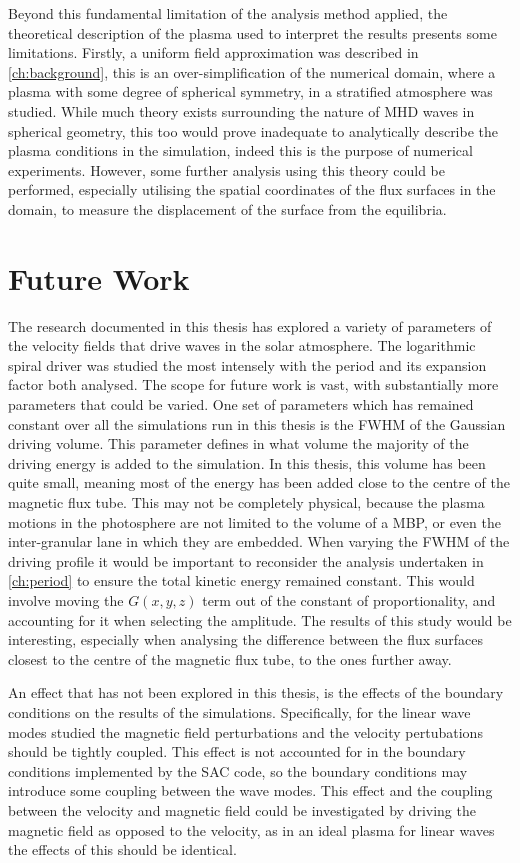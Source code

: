Beyond this fundamental limitation of the analysis method applied, the theoretical description of the plasma used to interpret the results presents some limitations.
Firstly, a uniform field approximation was described in \cref{ch:background}, this is an over-simplification of the numerical domain, where a plasma with some degree of spherical symmetry, in a stratified atmosphere was studied.
While much theory exists surrounding the nature of MHD waves in spherical geometry, this too would prove inadequate to analytically describe the plasma conditions in the simulation, indeed this is the purpose of numerical experiments.
However, some further analysis using this theory could be performed, especially utilising the spatial coordinates of the flux surfaces in the domain, to measure the displacement of the surface from the equilibria.

\section{Future Work}

The research documented in this thesis has explored a variety of parameters of the velocity fields that drive waves in the solar atmosphere.
The logarithmic spiral driver was studied the most intensely with the period and its expansion factor both analysed.
The scope for future work is vast, with substantially more parameters that could be varied.
One set of parameters which has remained constant over all the simulations run in this thesis is the FWHM of the Gaussian driving volume.
This parameter defines in what volume the majority  of the driving energy is added to the simulation.
In this thesis, this volume has been quite small, meaning most of the energy has been added close to the centre of the magnetic flux tube.
This may not be completely physical, because the plasma motions in the photosphere are not limited to the volume of a MBP, or even the inter-granular lane in which they are embedded.
When varying the FWHM of the driving profile it would be important to reconsider the analysis undertaken in \cref{ch:period} to ensure the total kinetic energy remained constant.
This would involve moving the $G(x,y,z)$ term out of the constant of proportionality, and accounting for it when selecting the amplitude.
The results of this study would be interesting, especially when analysing the difference between the flux surfaces closest to the centre of the magnetic flux tube, to the ones further away.

An effect that has not been explored in this thesis, is the effects of the boundary conditions on the results of the simulations.
Specifically, for the linear wave modes studied the magnetic field perturbations and the velocity pertubations should be tightly coupled.
This effect is not accounted for in the boundary conditions implemented by the SAC code, so the boundary conditions may introduce some coupling between the wave modes.
This effect and the coupling between the velocity and magnetic field could be investigated by driving the magnetic field as opposed to the velocity, as in an ideal plasma for linear waves the effects of this should be identical.

